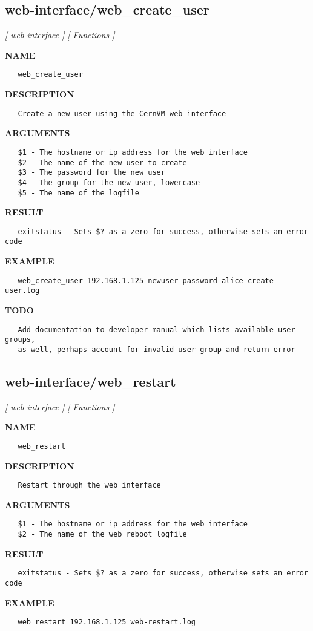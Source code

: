 \subsection{web-interface/web\_create\_user}
\textsl{[ web-interface ]}
\textsl{[ Functions ]}

\label{ch:robo80}
\label{ch:web_interface_web_create_user}
\textbf{NAME}
\begin{verbatim}
   web_create_user
\end{verbatim}
\textbf{DESCRIPTION}
\begin{verbatim}
   Create a new user using the CernVM web interface
\end{verbatim}
\textbf{ARGUMENTS}
\begin{verbatim}
   $1 - The hostname or ip address for the web interface
   $2 - The name of the new user to create
   $3 - The password for the new user
   $4 - The group for the new user, lowercase
   $5 - The name of the logfile
\end{verbatim}
\textbf{RESULT}
\begin{verbatim}
   exitstatus - Sets $? as a zero for success, otherwise sets an error code
\end{verbatim}
\textbf{EXAMPLE}
\begin{verbatim}
   web_create_user 192.168.1.125 newuser password alice create-user.log
\end{verbatim}
\textbf{TODO}
\begin{verbatim}
   Add documentation to developer-manual which lists available user groups,
   as well, perhaps account for invalid user group and return error
\end{verbatim}
\newpage
\subsection{web-interface/web\_restart}
\textsl{[ web-interface ]}
\textsl{[ Functions ]}

\label{ch:robo81}
\label{ch:web_interface_web_restart}
\textbf{NAME}
\begin{verbatim}
   web_restart
\end{verbatim}
\textbf{DESCRIPTION}
\begin{verbatim}
   Restart through the web interface
\end{verbatim}
\textbf{ARGUMENTS}
\begin{verbatim}
   $1 - The hostname or ip address for the web interface
   $2 - The name of the web reboot logfile
\end{verbatim}
\textbf{RESULT}
\begin{verbatim}
   exitstatus - Sets $? as a zero for success, otherwise sets an error code
\end{verbatim}
\textbf{EXAMPLE}
\begin{verbatim}
   web_restart 192.168.1.125 web-restart.log
\end{verbatim}
\newpage
